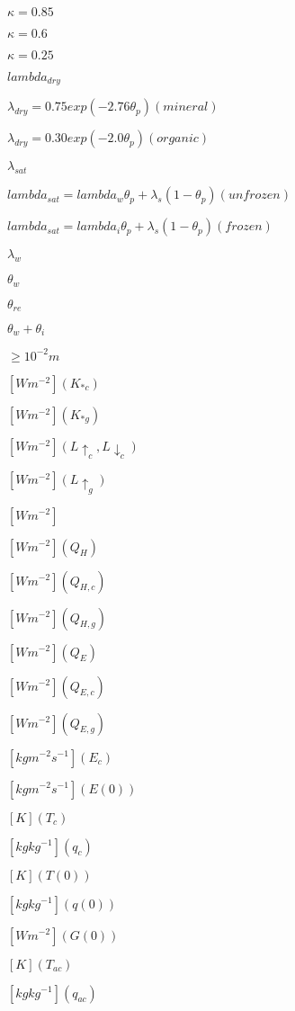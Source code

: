 \documentclass{article}
\begin{document}
{$\kappa = 0.85$
\pagebreak

$\kappa = 0.6$
\pagebreak

$\kappa = 0.25$
\pagebreak

$lambda_{dry}$
\pagebreak

$\lambda_{dry} = 0.75 exp(-2.76 \theta_p) (mineral)$
\pagebreak

$\lambda_{dry} = 0.30 exp(-2.0 \theta_p) (organic)$
\pagebreak

$\lambda_{sat}$
\pagebreak

$lambda_{sat} = lambda_w \theta_p + \lambda_s (1 - \theta_p) (unfrozen)$
\pagebreak

$lambda_{sat} = lambda_i \theta_p + \lambda_s (1 - \theta_p) (frozen)$
\pagebreak

$\lambda_w$
\pagebreak

$\theta_w$
\pagebreak

$\theta_{re}$
\pagebreak

$\theta_w + \theta_i$
\pagebreak

$\geq 10^{-2} m$
\pagebreak

$[W m^{-2} ] (K_{*c} )$
\pagebreak

$[W m^{-2} ] (K_{*g} )$
\pagebreak

$[W m^{-2} ] (L \uparrow_c , L \downarrow_c )$
\pagebreak

$[W m^{-2} ] (L \uparrow_g )$
\pagebreak

$[W m^{-2} ] $
\pagebreak

$[W m^{-2} ] (Q_H )$
\pagebreak

$[W m^{-2} ] (Q_{H,c} )$
\pagebreak

$[W m^{-2} ] (Q_{H,g} )$
\pagebreak

$[W m^{-2} ] (Q_E )$
\pagebreak

$[W m^{-2} ] (Q_{E,c} )$
\pagebreak

$[W m^{-2} ] (Q_{E,g} )$
\pagebreak

$[kg m^{-2} s^{-1} ] (E_c )$
\pagebreak

$[kg m^{-2} s^{-1} ] (E(0))$
\pagebreak

$[K] (T_c )$
\pagebreak

$[kg kg^{-1} ] (q_c )$
\pagebreak

$[K] (T(0))$
\pagebreak

$[kg kg^{-1} ] (q(0))$
\pagebreak

$[W m^{-2} ] (G(0))$
\pagebreak

$[K] (T_{ac} )$
\pagebreak

$[kg kg^{-1} ] (q_{ac} )$
\pagebreak

}
\end{document}
